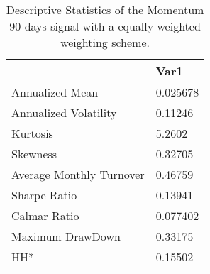 \begin{table}[H]
\centering
\begin{tabular}{ll}
\hline& Var1 \\ 
\hline 
Annualized Mean & 0.025678 \\ 
Annualized Volatility & 0.11246 \\ 
Kurtosis & 5.2602 \\ 
Skewness & 0.32705 \\ 
Average Monthly Turnover & 0.46759 \\ 
Sharpe Ratio & 0.13941 \\ 
Calmar Ratio & 0.077402 \\ 
Maximum DrawDown & 0.33175 \\ 
HH* & 0.15502 \\ 
\hline
\end{tabular}
\caption{Descriptive Statistics of the Momentum 90 days signal with a equally weighted weighting scheme.}
\label{MOM90EW}
\end{table}